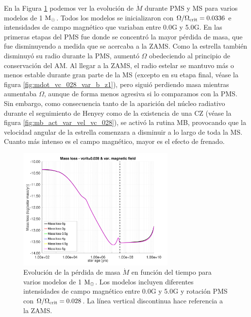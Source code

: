 En la Figura \ref{fig:mdot_vc_028_var_b} podemos ver la evolución de $\Dot{M}$ durante PMS y MS para varios modelos de 1 $\mathrm{M}_\odot$. Todos los modelos se inicializaron con $\Omega / \Omega_{\mathrm{crit}}=0.0336$ e intensidades de campo magnético que variaban entre 0.0G y 5.0G. En las primeras etapas del PMS fue donde se concentró la mayor pérdida de masa, que fue disminuyendo a medida que se acercaba a la ZAMS. Como la estrella también disminuyó su radio durante la PMS, aumentó $\Omega$ obedeciendo al principio de conservación del AM. Al llegar a la ZAMS, el radio estelar se mantuvo más o menos estable durante gran parte de la MS (excepto en su etapa final, véase la figura \ref{fig:mdot_vc_028_var_b_z1}), pero siguió perdiendo masa mientras aumentaba $\Omega$, aunque de forma menos agresiva si lo comparamos con la PMS. Sin embargo, como consecuencia tanto de la aparición del núcleo radiativo durante el seguimiento de Henyey como de la existencia de una CZ (véase la figura \ref{fig:mb_act_var_vel_vc_028}), se activó la rutina MB, provocando que la velocidad angular de la estrella comenzara a disminuir a lo largo de toda la MS. Cuanto más intenso es el campo magnético, mayor es el efecto de frenado.\par 

\begin{figure}
    \centering
    \includegraphics[width=0.7\textwidth]{img/paper1/mdot_vc_028_var_g.pdf}
	\caption{Evolución de la pérdida de masa $\Dot{M}$ en función del tiempo para varios modelos de 1 $\mathrm{M}_\odot$. Los modelos incluyen diferentes intensidades de campo magnético entre 0.0G y 5.0G y rotación PMS con $\Omega / \Omega_{\mathrm{crit}}=0.028$. La línea vertical discontinua hace referencia a la ZAMS.}
	\label{fig:mdot_vc_028_var_b}
\end{figure}

